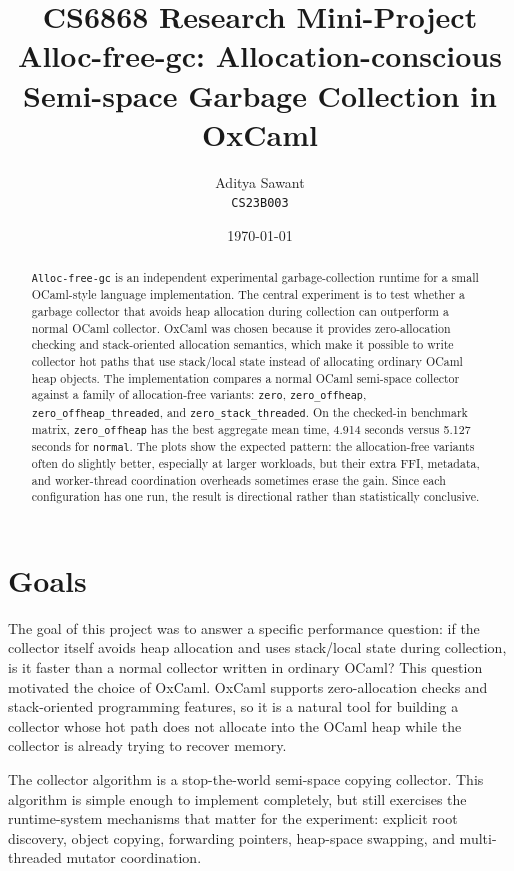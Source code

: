 \documentclass[11pt,a4paper]{article}
\title{%
  \textbf{CS6868 Research Mini-Project} \\[0.3em]
  \Large Alloc-free-gc: Allocation-conscious Semi-space Garbage Collection in OxCaml%
}
\author{%
  Aditya Sawant \\ \texttt{CS23B003}
}
\date{\today}
\begin{document}
\maketitle

\begin{abstract}
\texttt{Alloc-free-gc} is an independent experimental garbage-collection
runtime for a small OCaml-style language implementation. The central experiment
is to test whether a garbage collector that avoids heap allocation during
collection can outperform a normal OCaml collector. OxCaml was chosen because it
provides zero-allocation checking and stack-oriented allocation semantics, which
make it possible to write collector hot paths that use stack/local state instead
of allocating ordinary OCaml heap objects. The implementation compares a normal
OCaml semi-space collector against a family of allocation-free variants:
\texttt{zero}, \texttt{zero\_offheap}, \texttt{zero\_offheap\_threaded}, and
\texttt{zero\_stack\_threaded}. On the checked-in benchmark matrix,
\texttt{zero\_offheap} has the best aggregate mean time, 4.914 seconds versus
5.127 seconds for \texttt{normal}. The plots show the expected pattern: the
allocation-free variants often do slightly better, especially at larger
workloads, but their extra FFI, metadata, and worker-thread coordination
overheads sometimes erase the gain. Since each configuration has one run, the
result is directional rather than statistically conclusive.
\end{abstract}

\section{Goals}
\label{sec:goals}

The goal of this project was to answer a specific performance question: if the
collector itself avoids heap allocation and uses stack/local state during
collection, is it faster than a normal collector written in ordinary OCaml? This
question motivated the choice of OxCaml. OxCaml supports zero-allocation checks
and stack-oriented programming features, so it is a natural tool for building a
collector whose hot path does not allocate into the OCaml heap while the
collector is already trying to recover memory.

The collector algorithm is a stop-the-world semi-space copying collector. This
algorithm is simple enough to implement completely, but still exercises the
runtime-system mechanisms that matter for the experiment: explicit root
discovery, object copying, forwarding pointers, heap-space swapping, and
multi-threaded mutator coordination.
\end{document}
